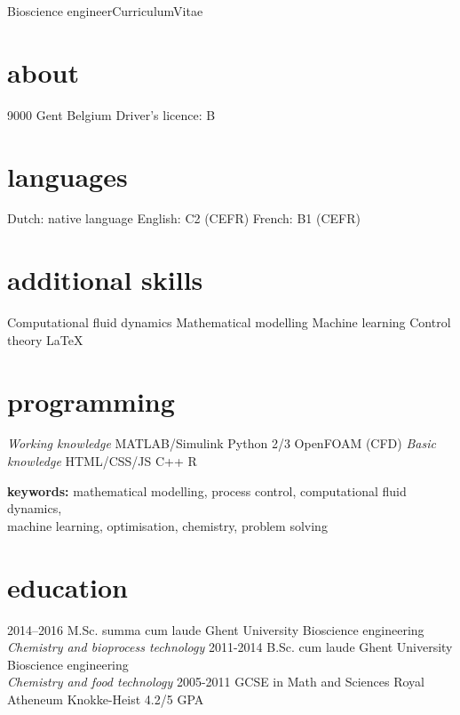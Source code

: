 \documentclass[]{friggeri-cv}
\begin{document}
       {Bioscience engineer}{Curriculum}{Vitae}
 \begin{aside}
  \vspace{0.6cm}\section{about}
    9000 Gent
    Belgium \vspace{0.21cm}
     \vspace{0.21cm}
    Driver's licence: B \vspace{-1.25mm}
  \section{languages}
    Dutch: native language
    English: C2 (CEFR)
    French:  B1  (CEFR) \vspace{3.3mm}
  \section{additional skills}
  Computational fluid dynamics
  Mathematical modelling
  Machine learning
  Control theory 
  LaTeX \vspace{3.3mm}
  \section{programming} 
  \textit{Working knowledge}
  MATLAB/Simulink
  Python 2/3
  OpenFOAM (CFD) \vspace{0.15cm}
  \textit{Basic knowledge}
  HTML/CSS/JS
  C++
  R
\end{aside}
{\textbf{keywords:} mathematical modelling, process control, computational fluid dynamics,\\ machine learning, optimisation, chemistry, problem solving}
\vspace{3mm}
\section{education}
\begin{entrylist}
    \entry
    {2014–2016}
    {M.Sc. summa cum laude}
    {Ghent University}
    {Bioscience engineering\\
    \emph{Chemistry and bioprocess technology}}
  \entry
    {2011-2014}
    {B.Sc. cum laude}
    {Ghent University}
    {Bioscience engineering\\
    \emph{Chemistry and food technology}}
  \entry
    {2005-2011}
    {GCSE in Math and Sciences}
    {Royal Atheneum Knokke-Heist}
    {4.2/5 GPA}
\end{entrylist}
\end{document}
